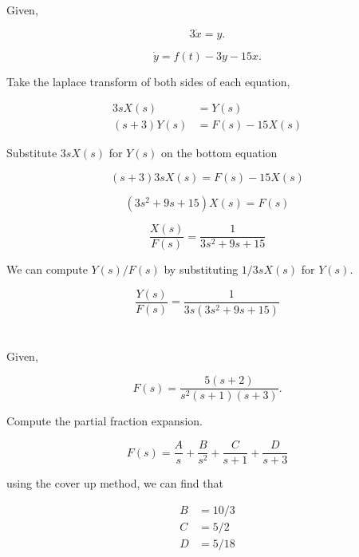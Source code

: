 \documentclass[12pt]{article}
\numberwithin{equation}{section}
\begin{document}
  Given,

  \[
      3\dot x = y
    .\]

  \[
      \dot y = f(t) - 3y - 15x
    .\]

  Take the laplace transform of both sides of each equation,

  \begin{equation}
    \begin{aligned}
      3sX(s) &= Y(s) \\
      (s + 3)Y(s) &= F(s) - 15X(s)
    \end{aligned}
  \end{equation}

  Substitute $ 3sX(s) $ for $ Y(s) $ on the bottom equation

  \begin{equation}
    (s + 3)3sX(s) = F(s) - 15X(s)
  \end{equation}

  \begin{equation}
    (3s^2 + 9s + 15)X(s) = F(s)
  \end{equation}

  \begin{equation}
    \frac{X(s)}{F(s)} = \frac{1}{3s^2 + 9s + 15}
  \end{equation}

  We can compute $ Y(s)/F(s) $ by substituting $ 1/3sX(s) $ for $ Y(s). $

  \begin{equation}
    \frac{Y(s)}{F(s)} = \frac{1}{3s(3s^2 + 9s + 15)}
  \end{equation}

  \newpage
  \section{}

  Given,

  \[
      F(s) = \frac{5(s+2)}{s ^2(s+1)(s+3)}
    .\]

  Compute the partial fraction expansion.

  \begin{equation}
    F(s) = \frac{A}{s} + \frac{B}{s ^2} + \frac{C}{s+1} + \frac{D}{s + 3}
  \end{equation}

  using the cover up method, we can find that

  \begin{align}
    B &= 10/3 \\
    C &= 5/2 \\
    D &= 5/18
  \end{align}
\end{document}
